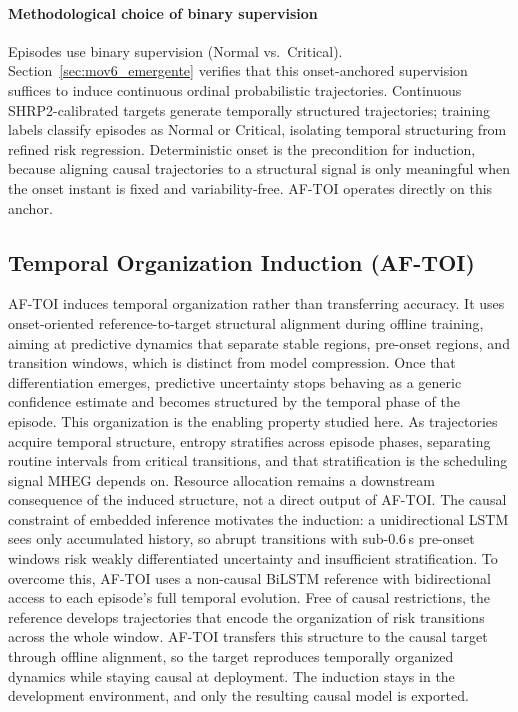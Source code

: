\documentclass[a4paper,fleqn]{cas-dc}
\newcommand{\AFTOI}{\mbox{AF-TOI}\xspace}
\newcommand{\MHEG}{\mbox{MHEG}\xspace}
\begin{document}
\paragraph{Methodological choice of binary supervision}
Episodes use binary supervision (Normal vs.\ Critical). Section~\ref{sec:mov6_emergente}
verifies that this onset-anchored supervision suffices to induce continuous
ordinal probabilistic trajectories. Continuous SHRP2-calibrated targets generate
temporally structured trajectories; training labels classify episodes as Normal
or Critical, isolating temporal structuring from refined risk regression.
Deterministic onset is the precondition for induction, because aligning causal trajectories to a structural signal is only meaningful when the onset instant is fixed and variability-free. \AFTOI operates directly on this anchor.
\subsection{Temporal Organization Induction (\mbox{AF-TOI})}
\label{sec:aftoi}
\AFTOI induces temporal organization rather than transferring accuracy. It uses
onset-oriented reference-to-target structural alignment during offline training,
aiming at predictive dynamics that separate stable regions, pre-onset regions,
and transition windows, which is distinct from model compression. Once that
differentiation emerges, predictive uncertainty stops behaving as a generic
confidence estimate and becomes structured by the temporal phase of the episode.
This organization is the enabling property studied here. As trajectories acquire
temporal structure, entropy stratifies across episode phases, separating routine
intervals from critical transitions, and that stratification is the scheduling
signal \MHEG depends on. Resource allocation remains a downstream consequence of
the induced structure, not a direct output of \AFTOI.
The causal constraint of embedded inference motivates the induction: a
unidirectional LSTM sees only accumulated history, so abrupt transitions with
sub-0.6\,s pre-onset windows risk weakly differentiated uncertainty and
insufficient stratification.
To overcome this, \AFTOI uses a non-causal BiLSTM reference with bidirectional
access to each episode's full temporal evolution. Free of causal restrictions,
the reference develops trajectories that encode the organization of risk
transitions across the whole window. \AFTOI transfers this structure to the
causal target through offline alignment, so the target reproduces temporally
organized dynamics while staying causal at deployment. The induction stays in
the development environment, and only the resulting causal model is exported.
\end{document}
